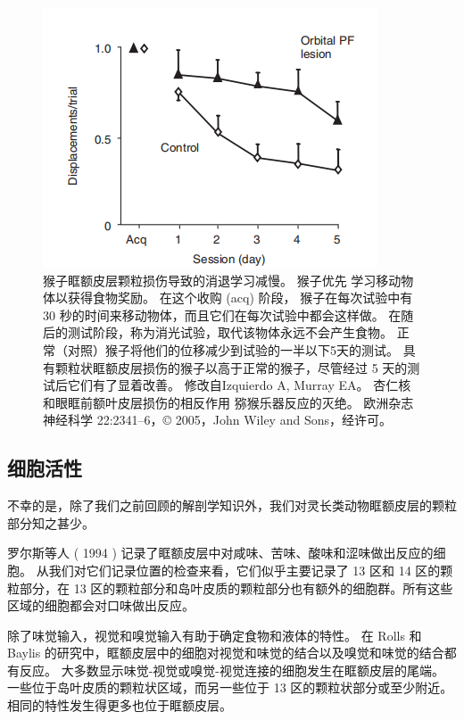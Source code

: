 \begin{figure}[!htb]
	\centering
	\includegraphics{image_pfc/Fig_4_4}
	\caption{猴子眶额皮层颗粒损伤导致的消退学习减慢。 猴子优先
		学习移动物体以获得食物奖励。 在这个收购 (acq) 阶段，
		猴子在每次试验中有 30 秒的时间来移动物体，而且它们在每次试验中都会这样做。 在随后的测试阶段，称为消光试验，取代该物体永远不会产生食物。 正常（对照）猴子将他们的位移减少到试验的一半以下5天的测试。 具有颗粒状眶额皮层损伤的猴子以高于正常的猴子，尽管经过 5 天的测试后它们有了显着改善。 修改自Izquierdo A, Murray EA。 杏仁核和眼眶前额叶皮层损伤的相反作用
		猕猴乐器反应的灭绝。 欧洲杂志神经科学 22:2341–6，© 2005，John Wiley and Sons，经许可。}\label{fig:fig_4_4}
\end{figure}



\subsection{细胞活性}

不幸的是，除了我们之前回顾的解剖学知识外，我们对灵长类动物眶额皮层的颗粒部分知之甚少。\par


罗尔斯等人 ( 1994 ) 记录了眶额皮层中对咸味、苦味、酸味和涩味做出反应的细胞。
从我们对它们记录位置的检查来看，它们似乎主要记录了 13 区和 14 区的颗粒部分，在 13 区的颗粒部分和岛叶皮质的颗粒部分也有额外的细胞群。所有这些区域的细胞都会对口味做出反应。\par


除了味觉输入，视觉和嗅觉输入有助于确定食物和液体的特性。
在 Rolls 和 Baylis 的研究中，眶额皮层中的细胞对视觉和味觉的结合以及嗅觉和味觉的结合都有反应。
大多数显示味觉-视觉或嗅觉-视觉连接的细胞发生在眶额皮层的尾端。
一些位于岛叶皮质的颗粒状区域，而另一些位于 13 区的颗粒状部分或至少附近。相同的特性发生得更多也位于眶额皮层。\par


